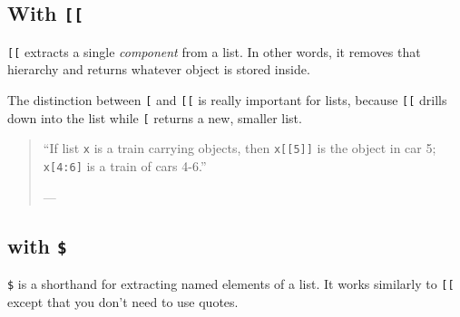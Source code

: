 \documentclass[]{book}
\newenvironment{Shaded}{\begin{snugshade}}{\end{snugshade}}
\newcommand{\KeywordTok}[1]{\textcolor[rgb]{0.13,0.29,0.53}{\textbf{#1}}}
\newcommand{\DecValTok}[1]{\textcolor[rgb]{0.00,0.00,0.81}{#1}}
\newcommand{\StringTok}[1]{\textcolor[rgb]{0.31,0.60,0.02}{#1}}
\newcommand{\CommentTok}[1]{\textcolor[rgb]{0.56,0.35,0.01}{\textit{#1}}}
\newcommand{\OperatorTok}[1]{\textcolor[rgb]{0.81,0.36,0.00}{\textbf{#1}}}
\newcommand{\NormalTok}[1]{#1}
\begin{document}
\subsection{\texorpdfstring{With
\texttt{{[}{[}}}{With {[}{[}}}\label{with-1}

\texttt{{[}{[}} extracts a single \emph{component} from a list. In other
words, it removes that hierarchy and returns whatever object is stored
inside.

\begin{Shaded}
\end{Shaded}

The distinction between \texttt{{[}} and \texttt{{[}{[}} is really
important for lists, because \texttt{{[}{[}} drills down into the list
while \texttt{{[}} returns a new, smaller list.

\begin{quote}
``If list \texttt{x} is a train carrying objects, then
\texttt{x{[}{[}5{]}{]}} is the object in car 5; \texttt{x{[}4:6{]}} is a
train of cars 4-6.''

--- \citet{RLangTip}
\end{quote}

\subsection{\texorpdfstring{with \texttt{\$}}{with \$}}\label{with-2}

\texttt{\$} is a shorthand for extracting named elements of a list. It
works similarly to \texttt{{[}{[}} except that you don't need to use
quotes.

\begin{Shaded}
\end{Shaded}
\end{document}
